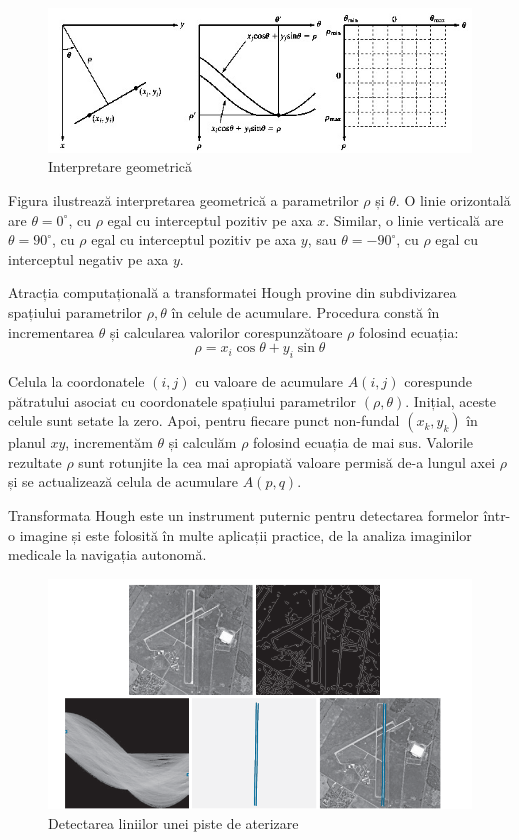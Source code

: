 \documentclass[a4paper,12pt]{report}
\begin{document}
\begin{figure}[h!]
    \centering
    \includegraphics[width=1\textwidth]{images/hough_space.jpg}
    \caption{Interpretare geometrică}
\end{figure}
\FloatBarrier

Figura ilustrează interpretarea geometrică a parametrilor $\rho$ și $\theta$. O linie orizontală are $\theta = 0^\circ$, cu $\rho$ egal cu interceptul pozitiv pe axa $x$. Similar, o linie verticală are $\theta = 90^\circ$, cu $\rho$ egal cu interceptul pozitiv pe axa $y$, sau $\theta = -90^\circ$, cu $\rho$ egal cu interceptul negativ pe axa $y$.

Atracția computațională a transformatei Hough provine din subdivizarea spațiului parametrilor $\rho, \theta$ în celule de acumulare. Procedura constă în incrementarea $\theta$ și calcularea valorilor corespunzătoare $\rho$ folosind ecuația:
\[
    \rho = x_i \cos \theta + y_i \sin \theta
\]

Celula la coordonatele $(i, j)$ cu valoare de acumulare $A(i, j)$ corespunde pătratului asociat cu coordonatele spațiului parametrilor $(\rho, \theta)$. Inițial, aceste celule sunt setate la zero. Apoi, pentru fiecare punct non-fundal $(x_k, y_k)$ în planul $xy$, incrementăm $\theta$ și calculăm $\rho$ folosind ecuația de mai sus. Valorile rezultate $\rho$ sunt rotunjite la cea mai apropiată valoare permisă de-a lungul axei $\rho$ și se actualizează celula de acumulare $A(p, q)$.

Transformata Hough este un instrument puternic pentru detectarea formelor într-o imagine și este folosită în multe aplicații practice, de la analiza imaginilor medicale la navigația autonomă.

\begin{figure}[h!]
    \centering
    \includegraphics[width=1\textwidth]{images/airport.jpg}
    \caption{Detectarea liniilor unei piste de aterizare}
\end{figure}
\FloatBarrier
\end{document}
